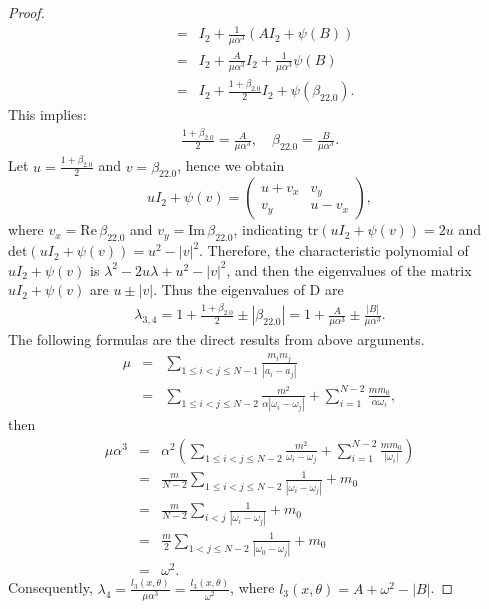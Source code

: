 \documentclass[10pt,a4paper]{amsart}
\begin{document}
\begin{proof}
\begin{eqnarray*}
 	&=&I_2+\frac{1}{\mu\alpha^3}(AI_2+\psi(B))\\
 	&=&I_2+\frac{A}{\mu\alpha^3}I_2+\frac{1}{\mu\alpha^3}\psi(B)\\
 	&=&I_2+\frac{1+\beta_{2.0}}{2}I_2+\psi(\beta_{22.0}).
 \end{eqnarray*}
 This implies:
 \begin{eqnarray*}
 	\frac{1+\beta_{2.0}}{2}=\frac{A}{\mu\alpha^3},\quad 
 	\beta_{22.0}=\frac{B}{\mu\alpha^3}.
 \end{eqnarray*}
 Let $u=\frac{1+\beta_{2.0}}{2}$ and $ v=\beta_{22.0}$, hence we obtain
 \begin{displaymath}
 uI_2+\psi(v)=\left(\begin{array}{cc}
 u+v_x&v_y\\
 v_y&u-v_x
 \end{array}
 \right),
 \end{displaymath}
 where $v_x=\text{Re}\,\beta_{22.0}$ and $ v_y=\text{Im}\,\beta_{22.0}$, indicating
 $\text{tr}(uI_2+\psi(v))=2u$ and $\text{det}(uI_2+\psi(v))=u^2-|v|^2$. 
 Therefore, the characteristic polynomial  of $uI_2+\psi(v)$ is $\lambda^2-2u\lambda+u^2-|v|^2$,
 and then the eigenvalues of the matrix $uI_2+\psi(v)$ are $u\pm|v|$. 
 Thus the eigenvalues of D are
 \begin{eqnarray*}
 	\lambda_{3,4}=1+\frac{1+\beta_{2.0}}{2}\pm|\beta_{22.0}|=1+\frac{A}{\mu\alpha^3}\pm\frac{|B|}{\mu\alpha^3}.
 \end{eqnarray*}
 The following formulas are the direct results from above arguments.
 \begin{eqnarray*}
 	\mu&=&\sum_{1\leq i<j\leq N-1}\frac{m_im_j}{|a_i-a_j|}\\
 	&=&\sum_{1\leq i<j\leq N-2}\frac{m^2}{\alpha|\omega_i-\omega_j|}+\sum_{i=1}^{N-2}\frac{mm_0}{\alpha\omega_i},
 \end{eqnarray*}
 then
 \begin{eqnarray*}
 	\mu\alpha^3&=&\alpha^2(\sum_{1\leq i<j\leq N-2}\frac{m^2}{\omega_i-\omega_j}+\sum_{i=1}^{N-2}\frac{mm_0}{|\omega_i|})
 	\\&=&\frac{m}{N-2}\sum_{1\leq i<j\leq N-2 }\frac{1}{|\omega_i-\omega_j|}+m_0
 	\\&=&\frac{m}{N-2}\sum_{i<j}\frac{1}{|\omega_i-\omega_j|}+m_0
 	\\&=&\frac{m}{2}\sum_{1<j\leq N-2}\frac{1}{|\omega_0-\omega_j|}+m_0
 	\\&=&\omega ^2.
 \end{eqnarray*}
 Consequently, $\lambda_4=\frac{l_3(x,\theta)}{\mu\alpha^3}
 =\frac{l_3(x,\theta)}{\omega^2}$, where $l_3(x,\theta)=A+\omega^2-|B|$.
\end{proof}
\end{document}
